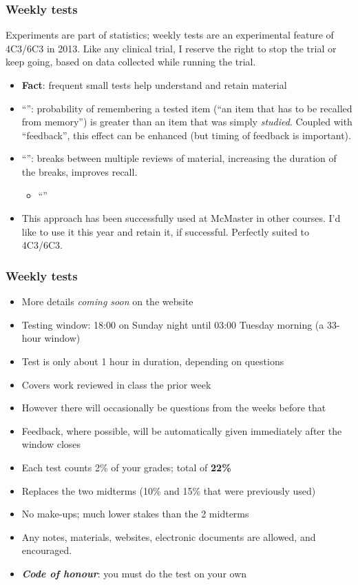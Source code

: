 \begin{frame}\frametitle{Weekly tests}
	\begin{exampleblock}{}
		Experiments are part of statistics; weekly tests are an experimental feature of 4C3/6C3 in 2013. Like any clinical trial, I reserve the right to stop the trial or keep going, based on data collected while running the trial.
	\end{exampleblock}

	\begin{itemize}
		\item	\textbf{Fact}: frequent small tests help understand and retain material
		\item	``\emph{{\color{purple}{Testing effect}}}'': probability of remembering a tested item (``an item that has to be recalled from memory'') is greater than an item that was simply \emph{studied}. Coupled with ``feedback'', this effect can be enhanced (but timing of feedback is important).
		\item	``{\color{purple}{Spacing effect}}'': breaks between multiple reviews of material, increasing the duration of the breaks, improves recall.
			\begin{itemize}
				\item	``{}''
			\end{itemize}
		
		\item	This approach has been successfully used at McMaster in other courses. I'd like to use it this year and retain it, if successful. Perfectly suited to 4C3/6C3.
	\end{itemize}
\end{frame}

\begin{frame}\frametitle{Weekly tests}
	\begin{itemize}
		\item	More details \emph{coming soon} on the website
		\item	Testing window: 18:00 on Sunday night until 03:00 Tuesday morning (a 33-hour window)
		\item	Test is only about 1 hour in duration, depending on questions
		\item	Covers work reviewed in class the prior week
		\item	However there will occasionally be questions from the weeks before that
		\item	Feedback, where possible, will be automatically given immediately after the window closes
		\item	Each test counts 2\% of your grades; total of \textbf{22\%}
		\item	Replaces the two midterms (10\% and 15\% that were previously used)
		\item	No make-ups; much lower stakes than the 2 midterms
		\item	Any notes, materials, websites, electronic documents are allowed, and encouraged.
		\item	\textbf{\emph{Code of honour}}: you must do the test on your own
	\end{itemize}
\end{frame}

